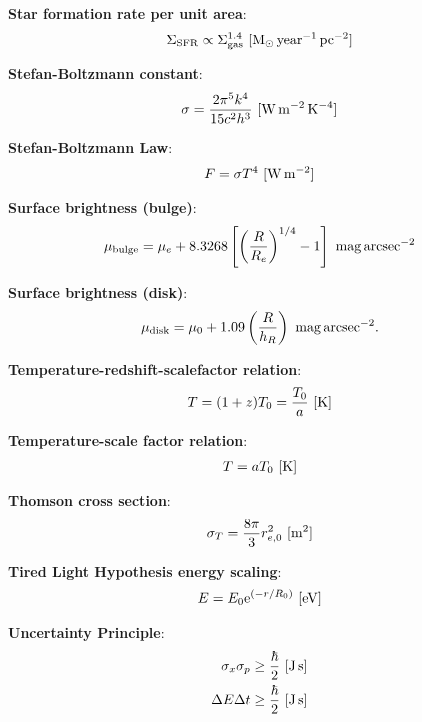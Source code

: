 \documentclass[a4paper,11pt]{article}
\begin{document}
{\noindent}\textbf{Star formation rate per unit area}:
\begin{align*}
    \Sigma_\mathrm{SFR} \propto \Sigma_\mathrm{gas}^{1.4} ~ [{\rm M_\odot\,year^{-1}\,pc^{-2}}]
\end{align*}

{\noindent}\textbf{Stefan-Boltzmann constant}:
\begin{align*}
    \sigma = \frac{2\pi^5k^4}{15c^2h^3} ~ [{\rm W\,m^{-2}\,K^{-4}}]
\end{align*}

{\noindent}\textbf{Stefan-Boltzmann Law}:
\begin{align*}
    F = \sigma T^4 ~ [{\rm W\,m^{-2}}]
\end{align*}

{\noindent}\textbf{Surface brightness (bulge)}:
\begin{align*}
    \mu_\mathrm{bulge} = \mu_e + 8.3268\left[\left(\frac{R}{R_e}\right)^{1/4}-1\right] ~ {\rm mag\,arcsec^{-2}}
\end{align*}

{\noindent}\textbf{Surface brightness (disk)}:
\begin{align*}
    \mu_\mathrm{disk} = \mu_0 + 1.09\left(\frac{R}{h_R}\right) ~ {\rm mag\,arcsec^{-2}}.
\end{align*}

{\noindent}\textbf{Temperature-redshift-scalefactor relation}:
\begin{align*}
    T = (1+z)T_0 = \frac{T_0}{a} ~ [{\rm K}]
\end{align*}

{\noindent}\textbf{Temperature-scale factor relation}:
\begin{align*}
    T = aT_0 ~ [{\rm K}]
\end{align*}

{\noindent}\textbf{Thomson cross section}:
\begin{align*}
\sigma_T = \frac{8\pi}{3}r_{e,0}^2 ~ [{\rm m^2}]
\end{align*}

{\noindent}\textbf{Tired Light Hypothesis energy scaling}:
\begin{align*}
    E = E_0 \mathrm{e}^{(-r/R_0)} ~ [{\rm eV}]
\end{align*}

{\noindent}\textbf{Uncertainty Principle}:
\begin{align*}
    \sigma_x\sigma_p \geq \frac{\hbar}{2} ~ [{\rm J\,s}] \\
    \Delta E \Delta t \geq \frac{\hbar}{2} ~ [{\rm J\,s}]
\end{align*}
\end{document}
